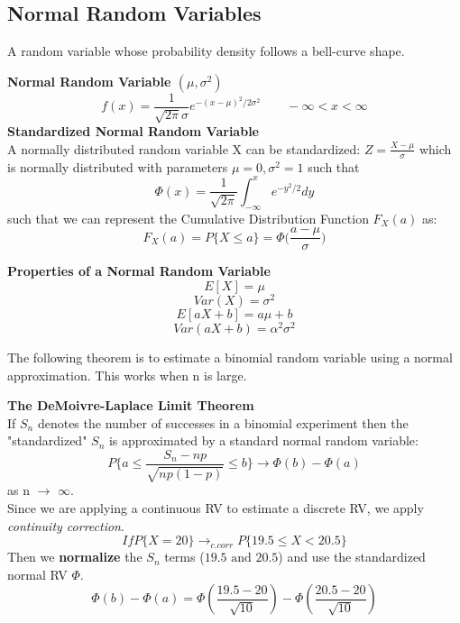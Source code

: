 \documentclass[10pt,a4paper]{article}
\begin{document}
    \subsection{Normal Random Variables}
    A random variable whose probability density follows a bell-curve shape.
    \begin{framed}
    	\centering\textbf{Normal Random Variable $(\mu, \sigma^{2})$}
    	$$f(x) = \frac{1}{\sqrt{2\pi}\sigma}e^{-(x-\mu)^{2}/2\sigma^{2}} \qquad -\infty < x < \infty$$ 
    	\centering\textbf{Standardized Normal Random Variable} \\
    	A normally distributed random variable X can be standardized: $Z = \frac{X - \mu}{\sigma}$ which is normally distributed with parameters $\mu = 0, \sigma^{2} = 1$ such that $$\Phi(x) = \frac{1}{\sqrt{2\pi}}\int^{x}_{-\infty}e^{-y^{2}/2}dy$$
    	such that we can represent the Cumulative Distribution Function $F_{X}(a)$ as:
    	      		$$F_{X}(a) =P\{X \leq a\} = \Phi\bigg(\frac{a-\mu}{\sigma}\bigg)$$
    \end{framed}       
    \newpage 
    \begin{framed}
    	      		\centering\textbf{Properties of a Normal Random Variable} 
    	      		$$E[X] = \mu$$
    	      		$$Var(X) = \sigma^{2}$$
    	      		$$E[aX + b] = a\mu + b$$
    	      		$$Var(aX + b) = \alpha^{2}\sigma^{2}$$
    \end{framed}
    The following theorem is to estimate a binomial random variable using a normal approximation. This works when n is large. 
    \begin{framed}
    	\centering\textbf{The DeMoivre-Laplace Limit Theorem} \\
    	If $S_{n}$ denotes the number of successes in a binomial experiment then the "standardized" $S_{n}$ is approximated by a standard normal random variable: $$P\bigg\{a \leq \frac{S_{n}-np}{\sqrt{np(1-p)}} \leq b\bigg\} \to \Phi(b) - \Phi(a)$$ as n $\to$ $\infty$.\\
    	 Since we are applying a continuous RV to estimate a discrete RV, we apply \emph{continuity correction}. $$If P\{X=20\} \to_{c.corr} P\{19.5 \leq X < 20.5\}$$ Then we \textbf{normalize} the $S_{n}$ terms ($19.5 \text{ and } 20.5$) and use the standardized normal RV $\Phi$. $$\Phi(b) - \Phi(a) = \Phi(\frac{19.5 - 20}{\sqrt{10}}) - \Phi(\frac{20.5 - 20}{\sqrt{10}})$$
     \end{framed}
\end{document}
